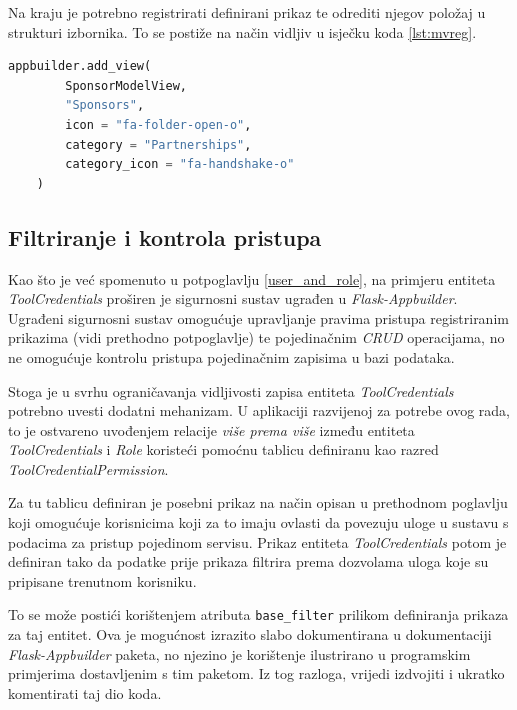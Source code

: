 \documentclass[times, utf8, diplomski]{fer}
\begin{document}
Na kraju je potrebno registrirati definirani prikaz te odrediti njegov položaj u
strukturi izbornika. To se postiže na način vidljiv u isječku koda
\ref{lst:mvreg}.

\begin{lstlisting}[language=Python,basicstyle=\scriptsize,frame=single,caption={
registracija prikaza},label={lst:mvreg}]
appbuilder.add_view(
        SponsorModelView,
        "Sponsors",
        icon = "fa-folder-open-o",
        category = "Partnerships",
        category_icon = "fa-handshake-o"
    )
\end{lstlisting}

\subsection{Filtriranje i kontrola pristupa} \label{acc_ctr}

Kao što je već spomenuto u potpoglavlju \ref{user_and_role}, na primjeru
entiteta \emph{ToolCredentials} proširen je sigurnosni sustav ugrađen u
\emph{Flask-Appbuilder}. Ugrađeni sigurnosni sustav omogućuje upravljanje
pravima pristupa registriranim prikazima (vidi prethodno potpoglavlje) te
pojedinačnim \emph{CRUD} operacijama, no ne omogućuje kontrolu pristupa
pojedinačnim zapisima u bazi podataka.

Stoga je u svrhu ograničavanja vidljivosti zapisa entiteta
\emph{ToolCredentials} potrebno uvesti dodatni mehanizam. U aplikaciji
razvijenoj za potrebe ovog rada, to je ostvareno uvođenjem relacije \emph{više
prema više} između entiteta \emph{ToolCredentials} i \emph{Role} koristeći
pomoćnu tablicu definiranu kao razred \emph{ToolCredentialPermission}.

Za tu tablicu definiran je posebni prikaz na način opisan u prethodnom poglavlju
koji omogućuje korisnicima koji za to imaju ovlasti da povezuju uloge u sustavu
s podacima za pristup pojedinom servisu. Prikaz entiteta \emph{ToolCredentials}
potom je definiran tako da podatke prije prikaza filtrira prema dozvolama uloga
koje su pripisane trenutnom korisniku.

To se može postići korištenjem atributa \texttt{base\_filter} prilikom
definiranja prikaza za taj entitet. Ova je mogućnost izrazito slabo
dokumentirana u dokumentaciji \emph{Flask-Appbuilder} paketa, no njezino je
korištenje ilustrirano u programskim primjerima dostavljenim s tim paketom. Iz
tog razloga, vrijedi izdvojiti i ukratko komentirati taj dio koda.
\end{document}
